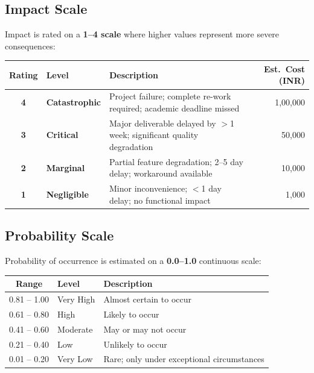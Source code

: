 \documentclass[11pt, a4paper]{article}
\begin{document}
\subsection{Impact Scale}

Impact is rated on a \textbf{1--4 scale} where higher values represent more severe consequences:

\begin{center}
\begin{tabular}{|c|l|p{7cm}|r|}
\hline
\rowcolor{lightgray}
\textbf{Rating} & \textbf{Level} & \textbf{Description} & \textbf{Est.\ Cost (INR)} \\
\hline
\rowcolor{red!8}
\textbf{4} & \textbf{Catastrophic} & Project failure; complete re-work required; academic deadline missed & 1,00,000 \\
\hline
\rowcolor{orange!8}
\textbf{3} & \textbf{Critical} & Major deliverable delayed by $>$1 week; significant quality degradation & 50,000 \\
\hline
\rowcolor{yellow!8}
\textbf{2} & \textbf{Marginal} & Partial feature degradation; 2--5 day delay; workaround available & 10,000 \\
\hline
\rowcolor{green!8}
\textbf{1} & \textbf{Negligible} & Minor inconvenience; $<$1 day delay; no functional impact & 1,000 \\
\hline
\end{tabular}
\end{center}



\subsection{Probability Scale}

Probability of occurrence is estimated on a \textbf{0.0--1.0} continuous scale:

\begin{center}
\begin{tabular}{|c|l|p{8cm}|}
\hline
\rowcolor{lightgray}
\textbf{Range} & \textbf{Level} & \textbf{Description} \\
\hline
\rowcolor{red!8}
0.81 -- 1.00 & Very High & Almost certain to occur \\
\hline
\rowcolor{orange!8}
0.61 -- 0.80 & High & Likely to occur \\
\hline
\rowcolor{yellow!8}
0.41 -- 0.60 & Moderate & May or may not occur \\
\hline
\rowcolor{green!8}
0.21 -- 0.40 & Low & Unlikely to occur \\
\hline
\rowcolor{green!8}
0.01 -- 0.20 & Very Low & Rare; only under exceptional circumstances \\
\hline
\end{tabular}
\end{center}
\end{document}
